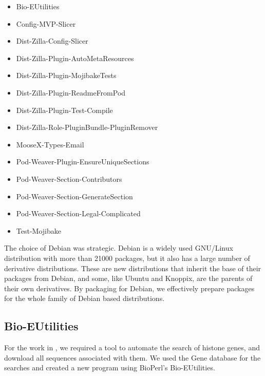 \begin{table}
  \label{tab:software:debian-packages}
  \begin{itemize}
  \item Bio-EUtilities
  \item Config-MVP-Slicer
  \item Dist-Zilla-Config-Slicer
  \item Dist-Zilla-Plugin-AutoMetaResources
  \item Dist-Zilla-Plugin-MojibakeTests
  \item Dist-Zilla-Plugin-ReadmeFromPod
  \item Dist-Zilla-Plugin-Test-Compile
  \item Dist-Zilla-Role-PluginBundle-PluginRemover
  \item MooseX-Types-Email
  \item Pod-Weaver-Plugin-EnsureUniqueSections
  \item Pod-Weaver-Section-Contributors
  \item Pod-Weaver-Section-GenerateSection
  \item Pod-Weaver-Section-Legal-Complicated
  \item Test-Mojibake
  \end{itemize}
\end{table}


The choice of Debian was strategic.  Debian is a widely used GNU/Linux
distribution with more than 21000 packages, but it also has a large
number of derivative distributions.  These are new distributions that
inherit the base of their packages from Debian, and some, like Ubuntu
and Knoppix, are the parents of their own derivatives.  By packaging
for Debian, we effectively prepare packages for the whole family of
Debian based distributions.

\subsection{Bio-EUtilities}

For the work in , we required a tool to
automate the search of histone genes, and download all sequences
associated with them.  We used the Gene database for the searches and
created a new program using BioPerl's Bio-EUtilities.

